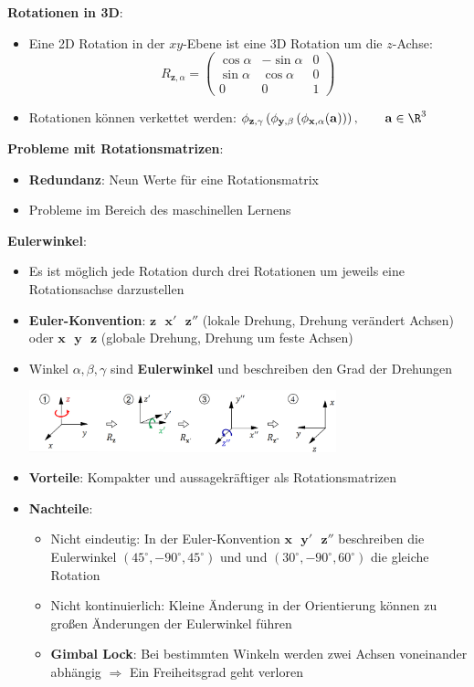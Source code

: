 \medskip
\textbf{Rotationen in 3D}:
\begin{itemize}
	\item Eine 2D Rotation in der $xy$-Ebene ist eine 3D Rotation um die $z$-Achse: $$R_{\mathbf{z},\alpha}=\left(\begin{matrix}
		\cos\alpha & -\sin\alpha & 0 \\
		\sin\alpha & \cos\alpha & 0 \\
		0 & 0 & 1
	\end{matrix}\right)$$
	\item Rotationen können verkettet werden: $\phi_{\mathbf{z},\gamma}\left(\phi_{\mathbf{y},\beta}\left(\phi_{\mathbf{x},\alpha}(\mathbf{a})\right)\right),\qquad \mathbf{a}\in\R^3$
\end{itemize}
\medskip
\textbf{Probleme mit Rotationsmatrizen}:
\begin{itemize}
	\item \textbf{Redundanz}: Neun Werte für eine Rotationsmatrix
	\item Probleme im Bereich des maschinellen Lernens
\end{itemize}
\bigskip
\textbf{Eulerwinkel}:
\begin{itemize}
	\item Es ist möglich jede Rotation durch drei Rotationen um jeweils eine Rotationsachse darzustellen
	\item \textbf{Euler-Konvention}: $\mathbf{z}\text{ }\mathbf{x'}\text{ }\mathbf{z''}$ (lokale Drehung, Drehung verändert Achsen) oder $\mathbf{x}\text{ }\mathbf{y}\text{ }\mathbf{z}$ (globale Drehung, Drehung um feste Achsen)
	\item Winkel $\alpha,\beta,\gamma$ sind \textbf{Eulerwinkel} und beschreiben den Grad der Drehungen
	\begin{center}
		\includegraphics[width=0.7\textwidth]{images/euler.png}
	\end{center}
	\item \textbf{Vorteile}: Kompakter und aussagekräftiger als Rotationsmatrizen
	\item \textbf{Nachteile}: 
	\begin{itemize}
		\item Nicht eindeutig: In der Euler-Konvention $\mathbf{x}\text{ }\mathbf{y'}\text{ }\mathbf{z''}$ beschreiben die Eulerwinkel $(45^\circ,-90^\circ,45^\circ)$ und 
		und $(30^\circ,-90^\circ,60^\circ)$ die gleiche Rotation
		\item Nicht kontinuierlich: Kleine Änderung in der Orientierung können zu großen Änderungen der Eulerwinkel führen
		\item \textbf{Gimbal Lock}: Bei bestimmten Winkeln werden zwei Achsen voneinander abhängig $\Rightarrow$ Ein Freiheitsgrad geht verloren
	\end{itemize}
\end{itemize}
